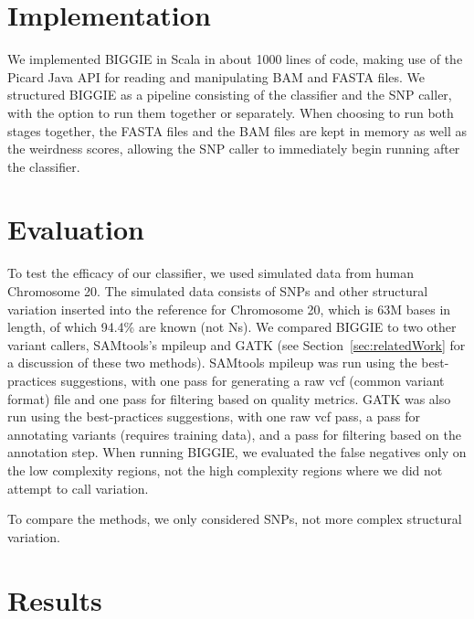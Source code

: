 \documentclass[10pt]{article}
\begin{document}
\section{Implementation}

We implemented BIGGIE in Scala in about 1000 lines of code, making use of the Picard Java API \cite{picard} for reading and manipulating BAM and FASTA files.
We structured BIGGIE as a pipeline consisting of the classifier and the SNP caller, with the option to run them together or separately.
When choosing to run both stages together, the FASTA files and the BAM files are kept in memory as well as the weirdness scores, allowing the SNP caller to immediately begin running after the classifier.

\section{Evaluation}

To test the efficacy of our classifier, we used
simulated data \cite{tvsim} from human Chromosome 20. The simulated data consists of SNPs and other structural variation 
inserted into the reference for Chromosome 20, which is $63$M bases in length,
of which 94.4\% are known (not Ns).
We compared BIGGIE to two other variant callers, SAMtools's mpileup and GATK (see Section~\ref{sec:relatedWork} for a discussion of these two methods). SAMtools mpileup was run using the best-practices suggestions, with one pass for generating a raw vcf (common variant format) file and one pass for filtering based on quality metrics. GATK was also run using the best-practices suggestions, with one raw vcf pass, a pass for annotating variants (requires training data), and a pass for filtering based on the annotation step. When running BIGGIE, we evaluated the false negatives only on the low complexity regions, not the high complexity regions where we did not attempt to call variation.

To compare the methods, we only considered SNPs, not more complex structural variation.

\section{Results}
\end{document}

